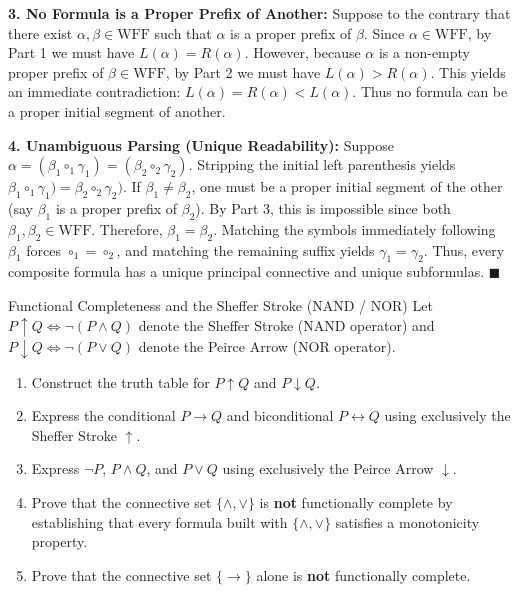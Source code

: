 \begin{solution}
\textbf{3. No Formula is a Proper Prefix of Another:}
Suppose to the contrary that there exist $\alpha, \beta \in \mathrm{WFF}$ such that $\alpha$ is a proper prefix of $\beta$.
Since $\alpha \in \mathrm{WFF}$, by Part 1 we must have $L(\alpha) = R(\alpha)$.
However, because $\alpha$ is a non-empty proper prefix of $\beta \in \mathrm{WFF}$, by Part 2 we must have $L(\alpha) > R(\alpha)$.
This yields an immediate contradiction: $L(\alpha) = R(\alpha) < L(\alpha)$. Thus no formula can be a proper initial segment of another.

\textbf{4. Unambiguous Parsing (Unique Readability):}
Suppose $\alpha = (\beta_1 \circ_1 \gamma_1) = (\beta_2 \circ_2 \gamma_2)$.
Stripping the initial left parenthesis yields $\beta_1 \circ_1 \gamma_1) = \beta_2 \circ_2 \gamma_2)$.
If $\beta_1 \ne \beta_2$, one must be a proper initial segment of the other (say $\beta_1$ is a proper prefix of $\beta_2$).
By Part 3, this is impossible since both $\beta_1, \beta_2 \in \mathrm{WFF}$.
Therefore, $\beta_1 = \beta_2$.
Matching the symbols immediately following $\beta_1$ forces $\circ_1 = \circ_2$, and matching the remaining suffix yields $\gamma_1 = \gamma_2$.
Thus, every composite formula has a unique principal connective and unique subformulas. \hfill $\blacksquare$
\end{solution}

\begin{exercise}{Functional Completeness and the Sheffer Stroke (NAND / NOR)}
Let $P \uparrow Q \iff \neg(P \land Q)$ denote the Sheffer Stroke (NAND operator) and $P \downarrow Q \iff \neg(P \lor Q)$ denote the Peirce Arrow (NOR operator).
\begin{enumerate}[leftmargin=1.5em,itemsep=2pt]
  \item Construct the truth table for $P \uparrow Q$ and $P \downarrow Q$.
  \item Express the conditional $P \to Q$ and biconditional $P \leftrightarrow Q$ using exclusively the Sheffer Stroke $\uparrow$.
  \item Express $\neg P$, $P \land Q$, and $P \lor Q$ using exclusively the Peirce Arrow $\downarrow$.
  \item Prove that the connective set $\{\land, \lor\}$ is \textbf{not} functionally complete by establishing that every formula built with $\{\land, \lor\}$ satisfies a monotonicity property.
  \item Prove that the connective set $\{\to\}$ alone is \textbf{not} functionally complete.
\end{enumerate}
\end{exercise}

